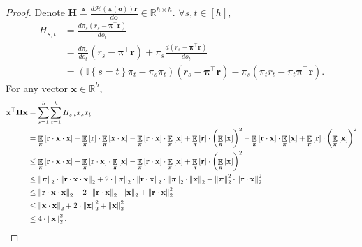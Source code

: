 \documentclass[10pt]{article}
\def\rvo{{\mathbf{o}}}
\def\rvr{{\mathbf{r}}}
\def\rvx{{\mathbf{x}}}
\def\rvo{{\mathbf{o}}}
\def\rvpi{{\boldsymbol{\pi}}}
\def\rmH{{\mathbf{H}}}
\def\sE{{\mathbb{E}}}
\def\sR{{\mathbb{R}}}
\def\sI{{\mathbb{I}}}
\def\gH{{\mathcal{H}}}
\DeclareMathOperator*{\expectation}{\sE}
\begin{document}
\begin{proof}
    Denote $\rmH \triangleq \frac{d \gH\left( \rvpi \left(\rvo \right) \right) \rvr}{d \rvo } \in \sR^{h \times h}$. $\forall s, t \in [h]$,
\begin{equation*}
\begin{split}
    H_{s, t} &= \frac{d \pi_{s} \left( r_{s} - \rvpi^\top \rvr \right) }{d o_{t}} \\
    &= \frac{d \pi_{s} }{d o_{t}} \left( r_{s} - \rvpi^\top \rvr \right) + \pi_{s} \frac{d \left( r_{s} - \rvpi^\top \rvr \right) }{d o_{t}} \\
    &=\left ( \sI\left\{ s = t\right\} \pi_{t} -  \pi_{s } \pi_{t} \right) \left( r_{s} - \rvpi^\top \rvr \right) - \pi_{s} \left( \pi_{t} r_{t} - \pi_{t} \rvpi^\top \rvr \right).
\end{split}
\end{equation*}
For any vector $\rvx \in \sR^h$, 
\begin{equation*}
\begin{split}
    \rvx^\top \rmH \rvx &= \sum\limits_{s=1}^{h}{ \sum\limits_{t=1}^{h}{ H_{s,t} x_s x_t} } \\
    &= \expectation\limits_{\rvpi}\left[ \rvr \cdot \rvx \cdot \rvx \right] - \expectation\limits_{\rvpi}\left[ \rvr \right] \cdot \expectation\limits_{\rvpi}\left[ \rvx \cdot \rvx \right] - \expectation\limits_{\rvpi}\left[ \rvr \cdot \rvx \right] \cdot \expectation\limits_{\rvpi}\left[ \rvx \right] + \expectation\limits_{\rvpi}\left[ \rvr \right] \cdot \left( \expectation\limits_{\rvpi}\left[ \rvx \right] \right)^2  - \expectation\limits_{\rvpi}\left[ \rvr \cdot \rvx \right] \cdot \expectation\limits_{\rvpi}\left[ \rvx \right] + \expectation\limits_{\rvpi}\left[ \rvr \right] \cdot \left( \expectation\limits_{\rvpi}\left[ \rvx \right] \right)^2 \\
    &\le \expectation\limits_{\rvpi}\left[ \rvr \cdot \rvx \cdot \rvx \right] - \expectation\limits_{\rvpi}\left[ \rvr \cdot \rvx \right] \cdot \expectation\limits_{\rvpi}\left[ \rvx \right] - \expectation\limits_{\rvpi}\left[ \rvr \cdot \rvx \right] \cdot \expectation\limits_{\rvpi}\left[ \rvx \right] + \expectation\limits_{\rvpi}\left[ \rvr \right] \cdot \left( \expectation\limits_{\rvpi}\left[ \rvx \right] \right)^2 \\
    &\le \left\| \rvpi \right\|_2 \cdot \left\| \rvr \cdot \rvx \cdot \rvx \right\|_2 + 2 \cdot \left\| \rvpi \right\|_2 \cdot \left\| \rvr \cdot \rvx \right\|_2 \cdot \left\| \rvpi \right\|_2 \cdot \left\| \rvx \right\|_2 + \left\| \rvpi \right\|_2^2 \cdot \left\| \rvr \cdot \rvx \right\|_2^2 \\
    &\le \left\| \rvr \cdot \rvx \cdot \rvx \right\|_2 + 2 \cdot \left\| \rvr \cdot \rvx \right\|_2 \cdot \left\| \rvx \right\|_2 + \left\| \rvr \cdot \rvx \right\|_2^2 \\
    &\le \left\| \rvx \cdot \rvx \right\|_2 + 2 \cdot \left\| \rvx \right\|_2^2 + \left\| \rvx \right\|_2^2 \\
    &\le 4 \cdot \left\| \rvx \right\|_2^2. \qedhere
\end{split}
\end{equation*}
\end{proof}
\end{document}
